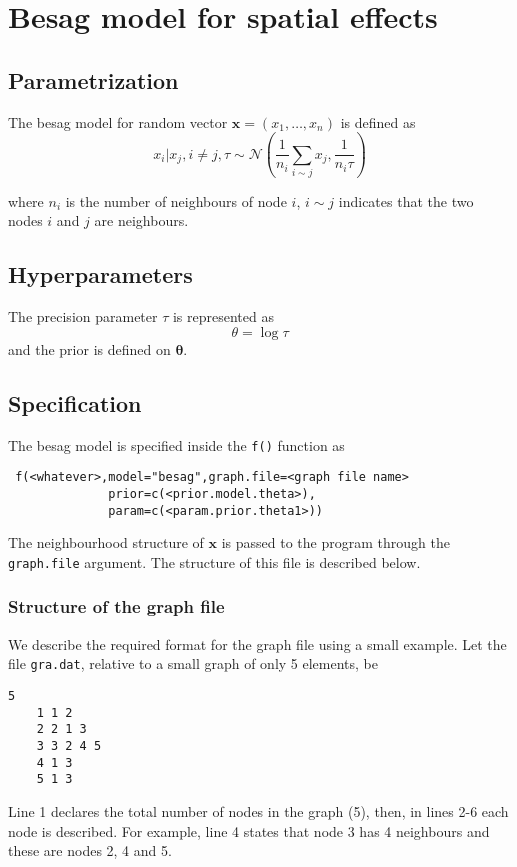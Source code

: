 \documentclass[a4paper,11pt]{article}
\begin{document}
\section*{Besag model for spatial effects}

\subsection*{Parametrization}

The besag model for random vector $\mathbf{x}=(x_1,\dots,x_n)$ is defined as
\begin{equation}\label{eq.besag}
    x_i|x_j,i\neq j,\tau\sim\mathcal{N}(\frac{1}{n_i}\sum_{i\sim j}x_j,\frac{1}{n_i\tau})
\end{equation}

where $n_i$ is the number of neighbours of node $i$, $i\sim j$
indicates that the two nodes $i$ and $j$ are neighbours.  


\subsection*{Hyperparameters}

The precision parameter $\tau$ is represented as
\begin{displaymath}
    \theta =\log \tau
\end{displaymath}
and the prior is defined on $\mathbf{\theta}$. 

\subsection*{Specification}

The besag model is specified inside the {\tt f()} function as
\begin{verbatim}
 f(<whatever>,model="besag",graph.file=<graph file name>
              prior=c(<prior.model.theta>),
              param=c(<param.prior.theta1>))
\end{verbatim}

The neighbourhood structure of $\mathbf{x}$ is passed to the program through the {\tt graph.file} argument. 
The structure of this file is described below.

\subsubsection*{Structure of the graph file}

We describe the required format for the graph file using a small
example. Let the file {\tt gra.dat}, relative to a small graph of only
5 elements, be
\begin{lstlisting}[basicstyle=\footnotesize]
    5
    1 1 2
    2 2 1 3
    3 3 2 4 5 
    4 1 3
    5 1 3
\end{lstlisting}
Line 1 declares the total number of nodes in the graph (5), then, in
lines 2-6 each node is described. For example, line 4 states that node
3 has 4 neighbours and these are nodes 2, 4 and 5.
\end{document}
